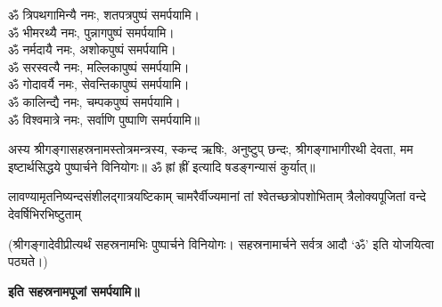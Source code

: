 
\begin{center}
ॐ त्रिपथगामिन्यै नमः, शतपत्रपुष्पं समर्पयामि।\\
ॐ भीमरथ्यै नमः, पुन्नागपुष्पं समर्पयामि।\\
ॐ नर्मदायै नमः, अशोकपुष्पं समर्पयामि।\\
ॐ सरस्वत्यै नमः, मल्लिकापुष्पं समर्पयामि।\\
ॐ गोदावर्यै नमः, सेवन्तिकापुष्पं समर्पयामि।\\
ॐ कालिन्द्यै नमः, चम्पकपुष्पं समर्पयामि।\\
ॐ विश्वमात्रे नमः, सर्वाणि पुष्पाणि समर्पयामि॥
\end{center}


अस्य श्रीगङ्गासहस्रनामस्तोत्रमन्त्रस्य, स्कन्द ऋषिः, अनुष्टुप् छन्दः, श्रीगङ्गाभागीरथी देवता,
मम इष्टार्थसिद्धये पुष्पार्चने विनियोगः॥ ॐ ह्रां ह्रीं इत्यादि षडङ्गन्यासं कुर्यात्॥


\begin{center}
{लावण्यामृतनिष्यन्दसंशीलद्गात्रयष्टिकाम्}
{चामरैर्वीज्यमानां तां श्वेतच्छत्रोपशोभिताम्}
{त्रैलोक्यपूजितां वन्दे देवर्षिभिरभिष्टुताम्}
\end{center}

(श्रीगङ्गादेवीप्रीत्यर्थं सहस्रनामभिः पुष्पार्चने विनियोगः। सहस्रनामार्चने सर्वत्र आदौ `ॐ'
इति योजयित्वा पठ्यते।)

\begingroup
\centering
\setlength{\columnseprule}{1pt}
\let\chapt\sect

\endgroup

\begin{center}
\textbf{इति सहस्रनामपूजां समर्पयामि॥}
\end{center}


\begingroup
\centering
\setlength{\columnseprule}{1pt}
\let\chapt\sect

\endgroup

